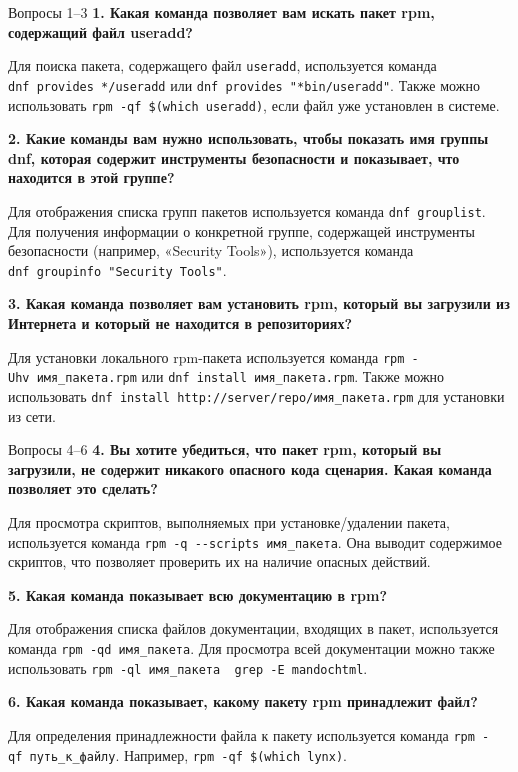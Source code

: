 \documentclass[
  ignorenonframetext,
  aspectratio=169,
  russian,
]{beamer}
\begin{document}
\begin{frame}[fragile]{Вопросы 1--3}
\protect{}\label{ux432ux43eux43fux440ux43eux441ux44b-13}
\textbf{1. Какая команда позволяет вам искать пакет rpm, содержащий файл
useradd?}

Для поиска пакета, содержащего файл \texttt{useradd}, используется
команда \texttt{dnf\ provides\ */useradd} или
\texttt{dnf\ provides\ "*bin/useradd"}. Также можно использовать
\texttt{rpm\ -qf\ \$(which\ useradd)}, если файл уже установлен в
системе.

\textbf{2. Какие команды вам нужно использовать, чтобы показать имя
группы dnf, которая содержит инструменты безопасности и показывает, что
находится в этой группе?}

Для отображения списка групп пакетов используется команда
\texttt{dnf\ grouplist}. Для получения информации о конкретной группе,
содержащей инструменты безопасности (например, «Security Tools»),
используется команда \texttt{dnf\ groupinfo\ "Security\ Tools"}.

\textbf{3. Какая команда позволяет вам установить rpm, который вы
загрузили из Интернета и который не находится в репозиториях?}

Для установки локального rpm-пакета используется команда
\texttt{rpm\ -Uhv\ имя\_пакета.rpm} или
\texttt{dnf\ install\ имя\_пакета.rpm}. Также можно использовать
\texttt{dnf\ install\ http://server/repo/имя\_пакета.rpm} для установки
из сети.
\end{frame}

\begin{frame}[fragile]{Вопросы 4--6}
\protect{}\label{ux432ux43eux43fux440ux43eux441ux44b-46}
\textbf{4. Вы хотите убедиться, что пакет rpm, который вы загрузили, не
содержит никакого опасного кода сценария. Какая команда позволяет это
сделать?}

Для просмотра скриптов, выполняемых при установке/удалении пакета,
используется команда \texttt{rpm\ -q\ -\/-scripts\ имя\_пакета}. Она
выводит содержимое скриптов, что позволяет проверить их на наличие
опасных действий.

\textbf{5. Какая команда показывает всю документацию в rpm?}

Для отображения списка файлов документации, входящих в пакет,
используется команда \texttt{rpm\ -qd\ имя\_пакета}. Для просмотра всей
документации можно также использовать
\texttt{rpm\ -ql\ имя\_пакета\ \textbar{}\ grep\ -E\ \textquotesingle{}man\textbar{}doc\textbar{}html\textquotesingle{}}.

\textbf{6. Какая команда показывает, какому пакету rpm принадлежит
файл?}

Для определения принадлежности файла к пакету используется команда
\texttt{rpm\ -qf\ путь\_к\_файлу}. Например,
\texttt{rpm\ -qf\ \$(which\ lynx)}.
\end{frame}
\end{document}
